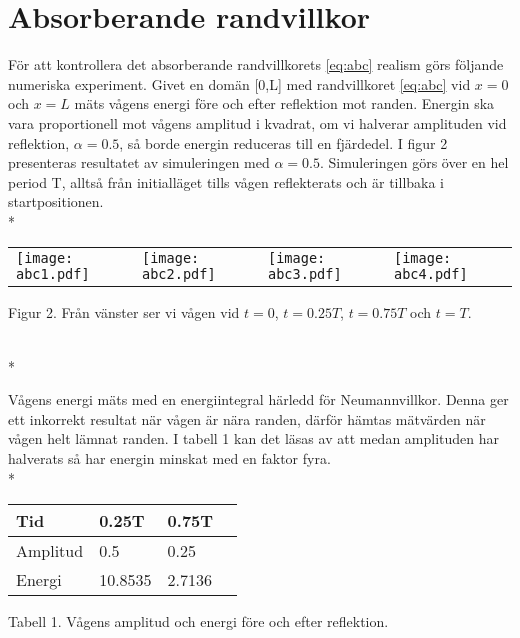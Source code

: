 \section*{Absorberande randvillkor}

För att kontrollera det absorberande randvillkorets \eqref{eq:abc} realism görs följande numeriska experiment. Givet en domän [0,L] med randvillkoret \eqref{eq:abc} vid $x = 0$ och $x = L$ mäts vågens energi före och efter reflektion mot randen. Energin ska vara proportionell mot vågens amplitud i kvadrat, om vi halverar amplituden vid reflektion, $\alpha = 0.5$, så borde energin reduceras till en fjärdedel. I figur 2 presenteras resultatet av simuleringen med $\alpha = 0.5$. Simuleringen görs över en hel period T, alltså från initialläget tills vågen reflekterats och är tillbaka i startpositionen.\\*
\newline
\begin{minipage}{\linewidth}
\begin{tabular}{llll}
\texttt{[image: abc1.pdf]} &
\texttt{[image: abc2.pdf]} &
\texttt{[image: abc3.pdf]} &
\texttt{[image: abc4.pdf]}
\end{tabular}
\begin{center}
\caption{Figur 2. Från vänster ser vi vågen vid $t = 0$, $t = 0.25 T$, $t = 0.75 T$ och $t = T$.}\\*
\end{center}
\end{minipage}
\newline
\newline
Vågens energi mäts med en energiintegral härledd för Neumannvillkor. Denna ger ett inkorrekt resultat när vågen är nära randen, därför hämtas mätvärden när vågen helt lämnat randen. I tabell 1 kan det läsas av att medan amplituden har halverats så har energin minskat med en faktor fyra.\\*

\begin{minipage}{\linewidth}
	\begin{center}
    \begin{tabular}{| l | l | l | l |}
    \hline
    Tid & 0.25T &  0.75T \\ \hline
    Amplitud & 0.5 & 0.25 \\ \hline
    Energi & 10.8535 & 2.7136 \\ \hline
    \end{tabular}
    \end{center}
    \newline
    \begin{center}
    \caption{Tabell 1. Vågens amplitud och energi före och efter reflektion.}
    \end{center}
\end{minipage}

